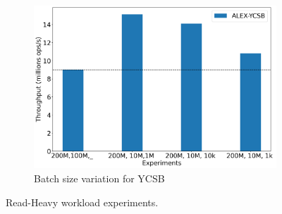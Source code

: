 \documentclass[12pt,a4paper]{article}
\begin{document}
\begin{figure}[htbp]
    \begin{subfigure}{0.35\textwidth}
        \includegraphics[width=\linewidth]{Figures/téléchargement.png}
        \caption{Batch size variation for YCSB}
        \label{fig:batchsize_variation}
    \end{subfigure}

    \caption{Read-Heavy workload experiments.}
    \label{fig:readheavy_experiments}
\end{figure}
\end{document}
